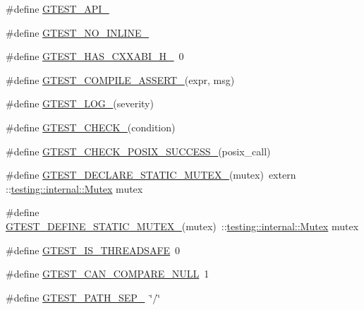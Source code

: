 \begin{DoxyCompactItemize}
\#define \hyperlink{fused-src_2gtest_2gtest_8h_aa73be6f0ba4a7456180a94904ce17790}{G\-T\-E\-S\-T\-\_\-\-A\-P\-I\-\_\-}
\item 
\#define \hyperlink{fused-src_2gtest_2gtest_8h_a9945cbd967fbccb15f8de711f58955c7}{G\-T\-E\-S\-T\-\_\-\-N\-O\-\_\-\-I\-N\-L\-I\-N\-E\-\_\-}
\item 
\#define \hyperlink{fused-src_2gtest_2gtest_8h_ae6239a8ccf4c230008d1db1ea8bd738e}{G\-T\-E\-S\-T\-\_\-\-H\-A\-S\-\_\-\-C\-X\-X\-A\-B\-I\-\_\-\-H\-\_\-}~0
\item 
\#define \hyperlink{fused-src_2gtest_2gtest_8h_ae1f37dc71d5daa6fb49ca1b6047d4a8c}{G\-T\-E\-S\-T\-\_\-\-C\-O\-M\-P\-I\-L\-E\-\_\-\-A\-S\-S\-E\-R\-T\-\_\-}(expr, msg)
\item 
\#define \hyperlink{fused-src_2gtest_2gtest_8h_a8ef4cb4c465db8c15464aecc6d9510ef}{G\-T\-E\-S\-T\-\_\-\-L\-O\-G\-\_\-}(severity)
\item 
\#define \hyperlink{fused-src_2gtest_2gtest_8h_ab54343f0a36dc4cb0ce8a478dd7847b8}{G\-T\-E\-S\-T\-\_\-\-C\-H\-E\-C\-K\-\_\-}(condition)
\item 
\#define \hyperlink{fused-src_2gtest_2gtest_8h_a38f6151210e363ad7c69a836b13cf0af}{G\-T\-E\-S\-T\-\_\-\-C\-H\-E\-C\-K\-\_\-\-P\-O\-S\-I\-X\-\_\-\-S\-U\-C\-C\-E\-S\-S\-\_\-}(posix\-\_\-call)
\item 
\#define \hyperlink{fused-src_2gtest_2gtest_8h_af0970cdea09f16dbb1dbfccdaa693eeb}{G\-T\-E\-S\-T\-\_\-\-D\-E\-C\-L\-A\-R\-E\-\_\-\-S\-T\-A\-T\-I\-C\-\_\-\-M\-U\-T\-E\-X\-\_\-}(mutex)~extern \-::\hyperlink{classtesting_1_1internal_1_1_mutex}{testing\-::internal\-::\-Mutex} mutex
\item 
\#define \hyperlink{fused-src_2gtest_2gtest_8h_a85d5cd679fdbe87383e7dfd1c6651eaa}{G\-T\-E\-S\-T\-\_\-\-D\-E\-F\-I\-N\-E\-\_\-\-S\-T\-A\-T\-I\-C\-\_\-\-M\-U\-T\-E\-X\-\_\-}(mutex)~\-::\hyperlink{classtesting_1_1internal_1_1_mutex}{testing\-::internal\-::\-Mutex} mutex
\item 
\#define \hyperlink{fused-src_2gtest_2gtest_8h_a727149862f53b2fb21f6d33cd9323886}{G\-T\-E\-S\-T\-\_\-\-I\-S\-\_\-\-T\-H\-R\-E\-A\-D\-S\-A\-F\-E}~0
\item 
\#define \hyperlink{fused-src_2gtest_2gtest_8h_ab8b3af84a03ff5a6d833c109f44c9db4}{G\-T\-E\-S\-T\-\_\-\-C\-A\-N\-\_\-\-C\-O\-M\-P\-A\-R\-E\-\_\-\-N\-U\-L\-L}~1
\item 
\#define \hyperlink{fused-src_2gtest_2gtest_8h_afbb636e91bdd50267dbef11a50490b29}{G\-T\-E\-S\-T\-\_\-\-P\-A\-T\-H\-\_\-\-S\-E\-P\-\_\-}~\char`\"{}/\char`\"{}
\item 

\end{DoxyCompactItemize}
